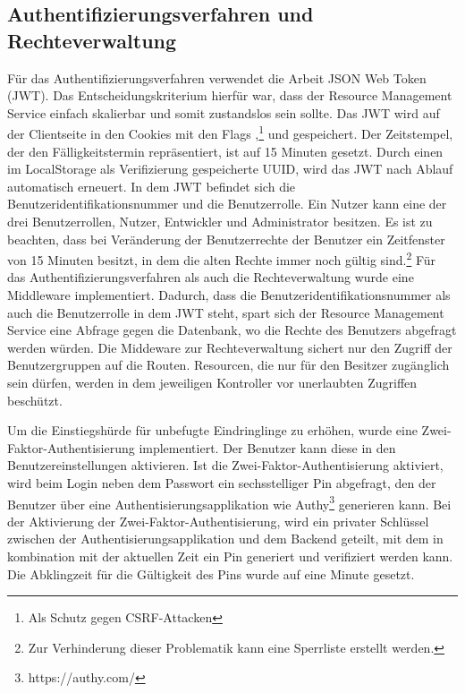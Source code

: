 \subsection{Authentifizierungsverfahren und Rechteverwaltung}
\label{subsec:authentifizierungsverfahrenundrechteverwaltung}
Für das Authentifizierungsverfahren verwendet die Arbeit JSON Web Token (JWT). Das Entscheidungskriterium hierfür war,
dass der Resource Management Service einfach skalierbar und somit zustandslos sein sollte. Das JWT wird auf der Clientseite
in den Cookies mit den Flags ,\footnote{Als Schutz gegen CSRF-Attacken}  und 
gespeichert. Der Zeitstempel, der den Fälligkeitstermin repräsentiert, ist auf 15 Minuten gesetzt. Durch einen im LocalStorage
als Verifizierung gespeicherte UUID, wird das JWT nach Ablauf automatisch erneuert. In dem JWT befindet sich die
Benutzeridentifikationsnummer und die Benutzerrolle. Ein Nutzer kann eine der drei Benutzerrollen, Nutzer, Entwickler und
Administrator besitzen. Es ist zu beachten, dass bei Veränderung der Benutzerrechte der Benutzer ein Zeitfenster von
15 Minuten besitzt, in dem die alten Rechte immer noch gültig sind.\footnote{Zur Verhinderung dieser Problematik
kann eine Sperrliste erstellt werden.} Für das Authentifizierungsverfahren als auch die Rechteverwaltung
wurde eine Middleware implementiert. Dadurch, dass die Benutzeridentifikationsnummer als auch die Benutzerrolle
in dem JWT steht, spart sich der Resource Management Service eine Abfrage gegen die Datenbank, wo die Rechte des Benutzers
abgefragt werden würden. Die Middeware zur Rechteverwaltung sichert nur den Zugriff der Benutzergruppen auf die Routen.
Resourcen, die nur für den Besitzer zugänglich sein dürfen, werden in dem jeweiligen Kontroller vor unerlaubten
Zugriffen beschützt.

Um die Einstiegshürde für unbefugte Eindringlinge zu erhöhen, wurde eine Zwei-Faktor-Authentisierung
implementiert. Der Benutzer kann diese in den Benutzereinstellungen aktivieren. Ist die Zwei-Faktor-Authentisierung aktiviert,
wird beim Login neben dem Passwort ein sechsstelliger Pin abgefragt, den der Benutzer über eine Authentisierungsapplikation
wie Authy\footnote{https://authy.com/} generieren kann. Bei der Aktivierung der Zwei-Faktor-Authentisierung, wird ein
privater Schlüssel zwischen der Authentisierungsapplikation und dem Backend geteilt, mit dem in kombination mit
der aktuellen Zeit ein Pin generiert und verifiziert werden kann. Die Abklingzeit für die Gültigkeit des Pins wurde
auf eine Minute gesetzt.

